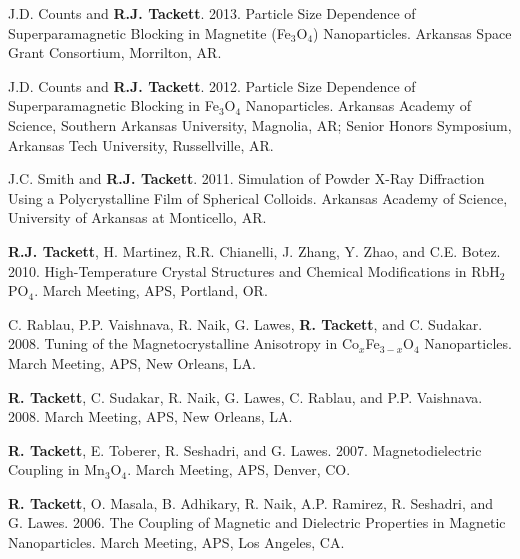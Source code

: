 \documentclass[10pt]{article}
\begin{document}
\begin{reflist}
\item J.D. Counts and \textbf{R.J. Tackett}. 2013. Particle Size Dependence of Superparamagnetic Blocking in Magnetite (Fe$_3$O$_4$) Nanoparticles. Arkansas Space Grant Consortium, Morrilton, AR.
\item J.D. Counts and \textbf{R.J. Tackett}. 2012. Particle Size Dependence of Superparamagnetic Blocking in Fe$_3$O$_4$ Nanoparticles. Arkansas Academy of Science, Southern Arkansas University, Magnolia, AR; Senior Honors Symposium, Arkansas Tech University, Russellville, AR.
\item J.C. Smith and \textbf{R.J. Tackett}. 2011. Simulation of Powder X-Ray Diffraction Using a Polycrystalline Film of Spherical Colloids. Arkansas Academy of Science, University of Arkansas at Monticello, AR.
\item \textbf{R.J. Tackett}, H. Martinez, R.R. Chianelli, J. Zhang, Y. Zhao, and C.E. Botez. 2010. High-Temperature Crystal Structures and Chemical Modifications in RbH$_2$PO$_4$. March Meeting, APS, Portland, OR.
\item C. Rablau, P.P. Vaishnava, R. Naik, G. Lawes, \textbf{R. Tackett}, and C. Sudakar. 2008. Tuning of the Magnetocrystalline Anisotropy in Co$_x$Fe$_{3-x}$O$_4$ Nanoparticles. March Meeting, APS, New Orleans, LA.
\item \textbf{R. Tackett}, C. Sudakar, R. Naik, G. Lawes, C. Rablau, and P.P. Vaishnava. 2008. March Meeting, APS, New Orleans, LA.
\item \textbf{R. Tackett}, E. Toberer, R. Seshadri, and G. Lawes. 2007. Magnetodielectric Coupling in Mn$_3$O$_4$. March Meeting, APS, Denver, CO.
\item \textbf{R. Tackett}, O. Masala, B. Adhikary, R. Naik, A.P. Ramirez, R. Seshadri, and G. Lawes. 2006. The Coupling of Magnetic and Dielectric Properties in Magnetic Nanoparticles. March Meeting, APS, Los Angeles, CA.
\end{reflist}



\end{document}
